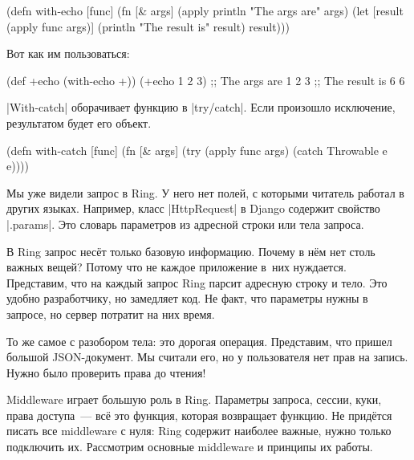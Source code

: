 \begin{english}
  \begin{clojure}
(defn with-echo [func]
  (fn [& args]
    (apply println "The args are" args)
    (let [result (apply func args)]
      (println "The result is" result)
      result)))
  \end{clojure}
\end{english}

\noindent
Вот как им пользоваться:

\begin{english}
  \begin{clojure}
(def +echo (with-echo +))
(+echo 1 2 3)
;; The args are 1 2 3
;; The result is 6
6
  \end{clojure}
\end{english}


\spverb|With-catch| оборачивает функцию в \spverb|try/catch|. Если произошло
исключение, результатом будет его объект.

\begin{english}
  \begin{clojure}
(defn with-catch [func]
  (fn [& args]
    (try
      (apply func args)
      (catch Throwable e
        e))))
  \end{clojure}
\end{english}


Мы уже видели запрос в Ring. У него нет полей, с которыми читатель работал в
других языках. Например, класс \spverb|HttpRequest| в Django содержит свойство
\spverb|.params|. Это словарь параметров из адресной строки или тела запроса.

В Ring запрос нес\"{е}т только базовую информацию. Почему в н\"{е}м нет столь
важных вещей? Потому что не каждое приложение в~них нуждается. Представим, что
на каждый запрос Ring парсит адресную строку и тело. Это удобно разработчику, но
замедляет код. Не факт, что параметры нужны в запросе, но сервер потратит на них
время.

То же самое с разобором тела: это дорогая операция. Представим, что пришел
большой JSON-документ. Мы считали его, но у пользователя нет прав на
запись. Нужно было проверить права до чтения!

Middleware играет большую роль в Ring. Параметры запроса, сессии, куки, права
доступа~--- вс\"{е} это функция, которая возвращает функцию. Не прид\"{е}тся писать
все middleware с нуля: Ring содержит наиболее важные, нужно только подключить
их. Рассмотрим основные middleware и принципы их работы.

